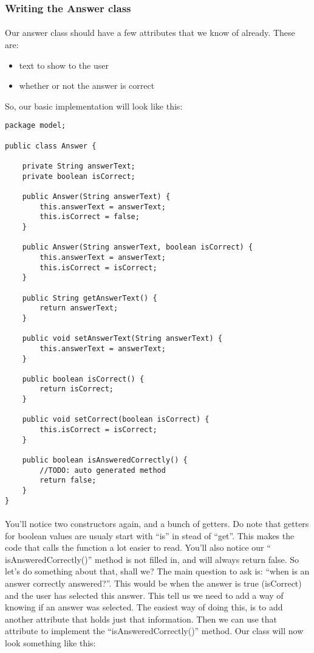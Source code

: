 \documentclass[11pt,fleqn]{book} %
\begin{document}
\subsubsection{Writing the Answer class}

\paragraph{}Our answer class should have a few attributes that we know of already. These are: 
\begin{itemize}
\item text to show to the user
\item whether or not the answer is correct
\end{itemize}
So, our basic implementation will look like this:

\begin{lstlisting}
package model;

public class Answer {
	
	private String answerText;
	private boolean isCorrect;
	
	public Answer(String answerText) {
		this.answerText = answerText;
		this.isCorrect = false;
	}
	
	public Answer(String answerText, boolean isCorrect) {
		this.answerText = answerText;
		this.isCorrect = isCorrect;
	}

	public String getAnswerText() {
		return answerText;
	}

	public void setAnswerText(String answerText) {
		this.answerText = answerText;
	}

	public boolean isCorrect() {
		return isCorrect;
	}

	public void setCorrect(boolean isCorrect) {
		this.isCorrect = isCorrect;
	}

	public boolean isAnsweredCorrectly() {
		//TODO: auto generated method
		return false;
	}
}
\end{lstlisting}

\paragraph{} You'll notice two constructors again, and a bunch of getters. Do note that getters for boolean values are usualy start with ``is'' in stead of ``get''. This makes the code that calls the function a lot easier to read. You'll also notice our `` isAnsweredCorrectly()'' method is not filled in, and will always return false.
So let's do something about that, shall we? The main question to ask is: ``when is an answer correctly answered?''. This would be when the answer is true (isCorrect) and the user has selected this answer. This tell us we need to add a way of knowing if an answer was selected. The easiest way of doing this, is to add another attribute that holds just that information. Then we can use that attribute to implement the ``isAnsweredCorrectly()'' method.
Our class will now look something like this:
\end{document}
